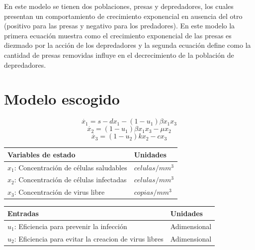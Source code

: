 \documentclass{article}
\begin{document}
        \vspace{0.5cm}

        En este modelo se tienen dos poblaciones, presas y depredadores, los
        cuales presentan un comportamiento de crecimiento exponencial en
        ausencia del otro (positivo para las presas y negativo para los
        predadores). En este modelo la primera ecuación muestra como el
        crecimiento exponencial de las presas es diezmado por la acción de los
        depredadores y la segunda ecuación define como la cantidad de presas
        removidas influye en el decrecimiento de la población de depredadores.

\newpage

\section{Modelo escogido}

    \Large
    $$\dot{x_1} = s -dx_1 - (1-u_1) \beta x_1 x_3$$
    $$\dot{x_2} = (1-u_1) \beta x_1 x_3 - \mu x_2$$
    $$\dot{x_3} = (1-u_2) k x_2 - c x_3$$
    \normalsize

\vspace{1cm}

    \begin{tabular}{|p{6cm} p{2.5cm}|}
        \hline
        \textbf{Variables de estado} & \textbf{Unidades} \\
        \hline
        $x_1$: Concentración de células saludables & $celulas / mm^3$\\
        $x_2$: Concentración de células infectadas & $celulas / mm^3$\\
        $x_3$: Concentración de virus libre        & $copias / mm^3$\\
        \hline
    \end{tabular}

    \vspace{0.5cm}

    \begin{tabular}{|p{8cm} p{2.5cm}|}
        \hline
        \textbf{Entradas} & \textbf{Unidades} \\
        \hline
        $u_1$: Eficiencia para prevenir la infección              & Adimensional \\
        $u_2$: Eficiencia para evitar la creacion de virus libres & Adimensional \\
        \hline
    \end{tabular}

    \vspace{0.5cm}
\end{document}
